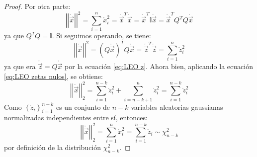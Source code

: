 \documentclass[11pt,a4paper,spanish]{article}
\numberwithin{equation}{section}
\numberwithin{table}{section}
\numberwithin{figure}{section}
\theoremstyle{definition}
\theoremstyle{remark}
\theoremstyle{definition}
\theoremstyle{remark}
\theoremstyle{plain}
\theoremstyle{plain}
\theoremstyle{plain}
\theoremstyle{plain}
\theoremstyle{plain}
\theoremstyle{plain}
\begin{document}
\begin{proof}
		Por otra parte:
		\[
		\left|\left|\mathring{\vec{x}}\right|\right|^{2}=\sum_{i=1}^{n}\mathring{x}_{i}^{2}=\mathring{\vec{x}}^{T}\mathring{\vec{x}}=\mathring{\vec{x}}^{T}\mathbb{I}\mathring{\vec{x}}=\mathring{\vec{x}}^{T}Q^{T}Q\mathring{\vec{x}}
		\]
		ya que $Q^{T}Q=\mathbb{I}$. Si seguimos operando, se tiene:
		\[
		\left|\left|\mathring{\vec{x}}\right|\right|^{2}=\left(Q\mathring{\vec{x}}\right)^{T}Q\mathring{\vec{x}}=\mathring{\vec{z}}^{T}\mathring{\vec{z}}=\sum_{i=1}^{n}\mathring{z}_{i}^{2}
		\]
		ya que era $\mathring{\vec{z}}=Q\mathring{\vec{x}}$ por la ecuación
		\vref{eq:LEO z}. Ahora bien, aplicando la ecuación \vref{eq:LEO zetas nulos},
		se obtiene:
		\[
		\left|\left|\mathring{\vec{x}}\right|\right|_{2}^{2}=\sum_{i=1}^{n-k}\mathring{z}_{i}^{2}+\sum_{i=n-k+1}^{n}\mathring{z}_{i}^{2}=\sum_{i=1}^{n-k}\mathring{z}_{i}^{2}
		\]
		Como $\left\{ \mathring{z}_{i}\right\} _{i=1}^{n-k}$ es un conjunto
		de $n-k$ variables aleatorias gaussianas normalizadas independientes
		entre sí, entonces:
		\[
		\left|\left|\mathring{\vec{x}}\right|\right|_{2}^{2}=\sum_{i=1}^{n}\mathring{x}_{i}^{2}=\sum_{i=1}^{n-k}\mathring{z}_{i}\sim\chi_{n-k}^{2}
		\]
		por definición de la distribución $\chi_{n-k}^{2}$.
	\end{proof}
	
	
	
\end{document}
